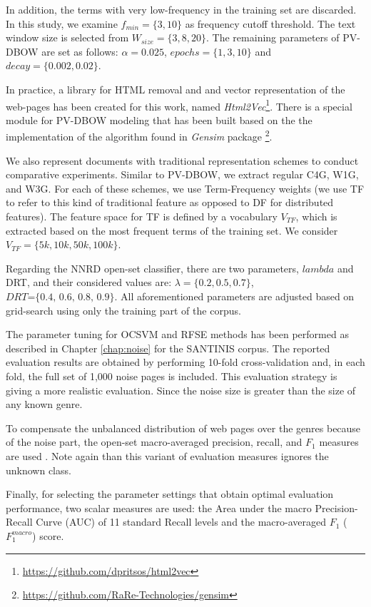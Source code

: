 In addition, the terms with very low-frequency in the training set are discarded. In this study, we examine $f_{min}=\{3,10\}$ as frequency cutoff threshold. The text window size is selected from $W_{size}=\{3,8,20\}$. The remaining parameters of PV-DBOW are set as follows: $\alpha=0.025$, $epochs=\{1, 3, 10\}$ and $decay=\{0.002, 0.02\}$. 

In practice, a library for HTML removal and and vector representation of the web-pages has been created for this work, named  \textit{Html2Vec}\footnote{\url{https://github.com/dpritsos/html2vec}}. There is a special module for PV-DBOW modeling that has been built based on the the implementation of the algorithm found in \textit{Gensim} package \footnote{\url{https://github.com/RaRe-Technologies/gensim}}. 

We also represent documents with traditional representation schemes to conduct comparative experiments. Similar to PV-DBOW, we extract regular C4G, W1G, and W3G. For each of these schemes, we use Term-Frequency weights (we use TF to refer to this kind of traditional feature as opposed to DF for distributed features). The feature space for TF is defined by a vocabulary $V_{TF}$, which is extracted based on the most frequent terms of the training set. We consider $V_{TF}=\{5k,10k,50k,100k\}$. 

Regarding the NNRD open-set classifier, there are two parameters, $lambda$ and DRT, and their considered values are: $\lambda =\{0.2, 0.5, 0.7\}$, $DRT\textit{=\{0.4, 0.6, 0.8, 0.9\}}$. All aforementioned parameters are adjusted based on grid-search using only the training part of the corpus.


The parameter tuning for OCSVM and RFSE methods has been performed as described in Chapter \ref{chap:noise} for the SANTINIS corpus. The reported evaluation results are obtained by performing 10-fold cross-validation and, in each fold, the full set of 1,000 noise pages is included. This evaluation strategy is giving a more realistic evaluation. Since the noise size is greater than the size of any known genre.

To compensate the unbalanced distribution of web pages over the genres because of the noise part, the open-set macro-averaged precision, recall, and $F_1$ measures are used . Note again than this variant of evaluation measures ignores the unknown class.  

Finally, for selecting the parameter settings that obtain optimal evaluation performance, two scalar measures are used: the Area under the macro Precision-Recall Curve (AUC) of 11 standard Recall levels and the macro-averaged $F_{1}$ ($F_1^{macro}$) score.

